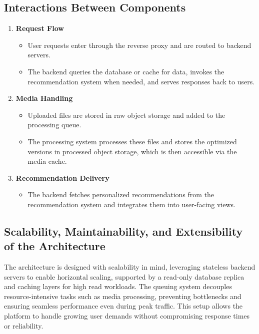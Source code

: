 \documentclass[12pt]{report}
\begin{document}
\subsection{Interactions Between Components}

\begin{enumerate}
	\item \textbf{Request Flow}
	      \begin{itemize}
		      \item User requests enter through the reverse proxy and are routed to backend
		            servers.
		      \item The backend queries the database or cache for data, invokes the
		            recommendation system when needed, and serves responses back to users.
	      \end{itemize}
	\item \textbf{Media Handling}
	      \begin{itemize}
		      \item Uploaded files are stored in raw object storage and added to the processing
		            queue.
		      \item The processing system processes these files and stores the optimized versions
		            in processed object storage, which is then accessible via the media cache.
	      \end{itemize}
	\item \textbf{Recommendation Delivery}
	      \begin{itemize}
		      \item The backend fetches personalized recommendations from the recommendation
		            system and integrates them into user-facing views.
	      \end{itemize}
\end{enumerate}

\subsection{Scalability, Maintainability, and Extensibility of the Architecture}

The architecture is designed with scalability in mind, leveraging stateless backend servers to
enable horizontal scaling, supported by a read-only database replica and caching layers for
high read workloads. The queuing system decouples resource-intensive tasks such as media
processing, preventing bottlenecks and ensuring seamless performance even during peak
traffic. This setup allows the platform to handle growing user demands without
compromising response times or reliability.
\end{document}
